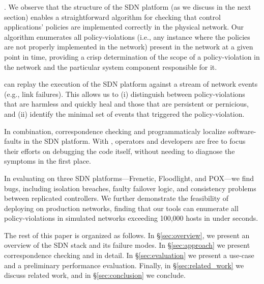 . We observe that the structure of the
SDN platform (as we discuss in the next section) enables a straightforward algorithm for
checking that control applications' policies are implemented correctly in
the physical network. Our algorithm enumerates all policy-violations (i.e., any instance where the policies are not properly implemented in the network) present in the network at a given point in
time, providing a crisp determination of the scope of a policy-violation in the
network and the particular system component responsible  
for it.

 \projectname{} can replay the execution of the SDN platform against
a stream of network events (e.g., link failures). This allows us to (i) distinguish between policy-violations that are harmless and quickly heal and those that are persistent or pernicious, and (ii) identify the minimal set of events that triggered
the policy-violation.

In combination, correspondence checking and \simulator{} programmaticaly localize software-faults in the SDN platform.
With \projectname{}, operators and developers are free to focus their efforts
on debugging the code itself, without needing to 
diagnose the symptoms in the first place.

In evaluating \projectname{} on
three SDN platforms---Frenetic, Floodlight, and POX---we find  bugs,
including isolation breaches,
faulty failover logic, and consistency problems between replicated
controllers. We further demonstrate the feasibility of deploying
\projectname{} on production networks,
finding that our tools can enumerate all policy-violations in 
simulated networks exceeding 100,000 hosts in under  seconds.

The rest of this paper is organized as follows. In \S\ref{sec:overview},
we present an overview of the SDN stack and its failure modes.
In \S\ref{sec:approach} we present correspondence checking and
\simulator{} in detail. In \S\ref{sec:evaluation} we present
a use-case and a preliminary performance evaluation.
Finally, in \S\ref{sec:related_work} we discuss related work,
and in \S\ref{sec:conclusion} we conclude.

